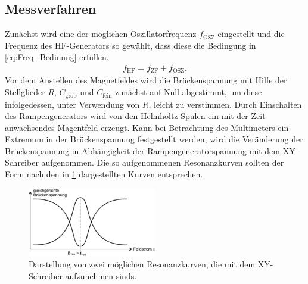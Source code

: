 \subsection{Messverfahren}
Zunächst wird eine der möglichen Oszillatorfrequenz $f_{\text{OSZ}}$ eingestellt und die Frequenz des HF-Generators so gewählt, dass diese
die Bedingung in \cref{eq:Freq_Bedinung} erfüllen.  
\begin{align}
\label{eq:Freq_Bedinung}
f_{\text{HF}}=f_{\text{ZF}}+f_{\text{OSZ}}.
\end{align}
Vor dem Anstellen des Magnetfeldes wird die Brückenspannung mit Hilfe der Stellglieder $R$, $C_{\text{grob}}$ und $C_{\text{fein}}$ 
zunächst auf Null abgestimmt, um diese infolgedessen, unter Verwendung von $R$, leicht zu verstimmen. Durch Einschalten des Rampengenerators
wird von den Helmholtz-Spulen ein mit der Zeit anwachsendes Magentfeld erzeugt. Kann bei Betrachtung des Multimeters ein Extremum in der 
Brückenspannung festgestellt werden, wird die Veränderung der Brückenspannung in Abhängigkeit
der Rampengeneratorspannung mit dem XY-Schreiber aufgenommen. Die so aufgenommenen Resonanzkurven sollten der Form nach den in 
\cref{fig:Resonanz} dargestellten Kurven entsprechen.    
\begin{figure}
\centering
\includegraphics[width=0.5\textwidth]{../Grafiken/Resonanz.pdf}
\caption{Darstellung von zwei möglichen Resonanzkurven, die mit dem XY-Schreiber aufzunehmen sinds.\cite{V28}}\label{fig:Resonanz}
\end{figure}

